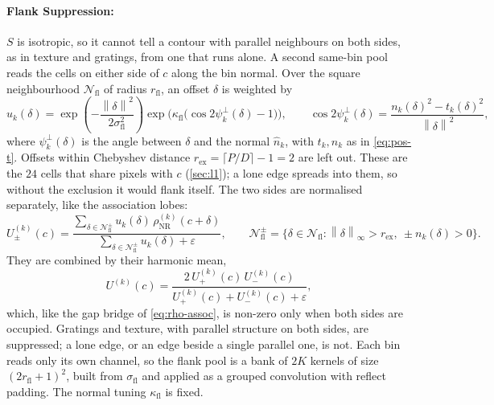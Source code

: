 \documentclass[11pt,a4paper]{article}
\newcommand{\norm}[1]{\left\lVert#1\right\rVert}
\begin{document}
\paragraph{Flank Suppression:}
$S$ is isotropic, so it cannot tell a contour with parallel neighbours on both sides, as in texture and gratings, from one that runs alone. A second same-bin pool reads the cells on either side of $c$ along the bin normal. Over the square neighbourhood $\mathcal{N}_{\mathrm{fl}}$ of radius $r_{\mathrm{fl}}$, an offset $\delta$ is weighted by
\begin{equation}\label{eq:flank-w}
  u_k(\delta) = \exp\!\left(-\frac{\norm{\delta}^2}{2\sigma_{\mathrm{fl}}^2}\right)
                \exp\!\bigl(\kappa_{\mathrm{fl}} \bigl(\cos 2\psi^{\perp}_k(\delta) - 1\bigr)\bigr),
  \qquad
  \cos 2\psi^{\perp}_k(\delta) = \frac{n_k(\delta)^2 - t_k(\delta)^2}{\norm{\delta}^2},
\end{equation}
where $\psi^{\perp}_k(\delta)$ is the angle between $\delta$ and the normal $\hat n_k$, with $t_k, n_k$ as in \cref{eq:pos-t}. Offsets within Chebyshev distance $r_{\mathrm{ex}} = \lceil P/D \rceil - 1 = 2$ are left out. These are the $24$ cells that share pixels with $c$ (\cref{sec:l1}); a lone edge spreads into them, so without the exclusion it would flank itself. The two sides are normalised separately, like the association lobes:
\begin{equation}\label{eq:flank-sides}
  U_{\pm}^{(k)}(c) = \frac{\sum_{\delta \in \mathcal{N}_{\mathrm{fl}}^{\pm}} u_k(\delta)\, \rho_{\mathrm{NR}}^{(k)}(c + \delta)}
                          {\sum_{\delta \in \mathcal{N}_{\mathrm{fl}}^{\pm}} u_k(\delta) + \varepsilon},
  \qquad
  \mathcal{N}_{\mathrm{fl}}^{\pm} = \bigl\{\delta \in \mathcal{N}_{\mathrm{fl}} : \norm{\delta}_\infty > r_{\mathrm{ex}},\ \pm n_k(\delta) > 0\bigr\}.
\end{equation}
They are combined by their harmonic mean,
\begin{equation}\label{eq:flank}
  U^{(k)}(c) = \frac{2\, U_+^{(k)}(c)\, U_-^{(k)}(c)}{U_+^{(k)}(c) + U_-^{(k)}(c) + \varepsilon},
\end{equation}
which, like the gap bridge of \cref{eq:rho-assoc}, is non-zero only when both sides are occupied. Gratings and texture, with parallel structure on both sides, are suppressed; a lone edge, or an edge beside a single parallel one, is not. Each bin reads only its own channel, so the flank pool is a bank of $2K$ kernels of size $(2r_{\mathrm{fl}} + 1)^2$, built from $\sigma_{\mathrm{fl}}$ and applied as a grouped convolution with reflect padding. The normal tuning $\kappa_{\mathrm{fl}}$ is fixed.
\end{document}
